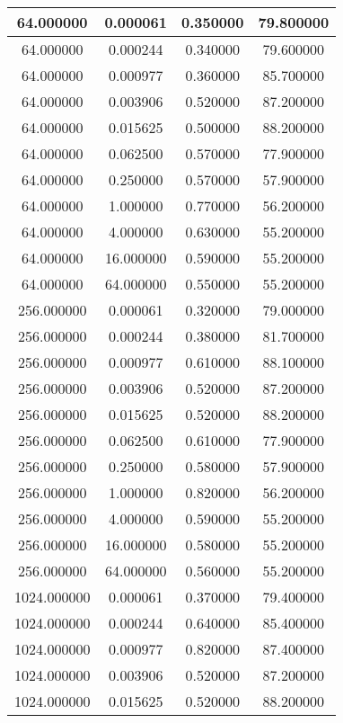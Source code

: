 \documentclass[12pt]{article}
\begin{document}
\begin{enumerate}[label=\alph*.]
\begin{longtable}{| c | c | c | c |}
		\hline
		64.000000 & 0.000061 & 0.350000 & 79.800000 \\
		\hline
		64.000000 & 0.000244 & 0.340000 & 79.600000 \\
		\hline
		64.000000 & 0.000977 & 0.360000 & 85.700000 \\
		\hline
		64.000000 & 0.003906 & 0.520000 & 87.200000 \\
		\hline
		64.000000 & 0.015625 & 0.500000 & 88.200000 \\
		\hline
		64.000000 & 0.062500 & 0.570000 & 77.900000 \\
		\hline
		64.000000 & 0.250000 & 0.570000 & 57.900000 \\
		\hline
		64.000000 & 1.000000 & 0.770000 & 56.200000 \\
		\hline
		64.000000 & 4.000000 & 0.630000 & 55.200000 \\
		\hline
		64.000000 & 16.000000 & 0.590000 & 55.200000 \\
		\hline
		64.000000 & 64.000000 & 0.550000 & 55.200000 \\
		\hline
		256.000000 & 0.000061 & 0.320000 & 79.000000 \\
		\hline
		256.000000 & 0.000244 & 0.380000 & 81.700000 \\
		\hline
		256.000000 & 0.000977 & 0.610000 & 88.100000 \\
		\hline
		256.000000 & 0.003906 & 0.520000 & 87.200000 \\
		\hline
		256.000000 & 0.015625 & 0.520000 & 88.200000 \\
		\hline
		256.000000 & 0.062500 & 0.610000 & 77.900000 \\
		\hline
		256.000000 & 0.250000 & 0.580000 & 57.900000 \\
		\hline
		256.000000 & 1.000000 & 0.820000 & 56.200000 \\
		\hline
		256.000000 & 4.000000 & 0.590000 & 55.200000 \\
		\hline
		256.000000 & 16.000000 & 0.580000 & 55.200000 \\
		\hline
		256.000000 & 64.000000 & 0.560000 & 55.200000 \\
		\hline
		1024.000000 & 0.000061 & 0.370000 & 79.400000 \\
		\hline
		1024.000000 & 0.000244 & 0.640000 & 85.400000 \\
		\hline
		1024.000000 & 0.000977 & 0.820000 & 87.400000 \\
		\hline
		1024.000000 & 0.003906 & 0.520000 & 87.200000 \\
		\hline
		1024.000000 & 0.015625 & 0.520000 & 88.200000 \\

\end{longtable}
\end{enumerate}
\end{document}

